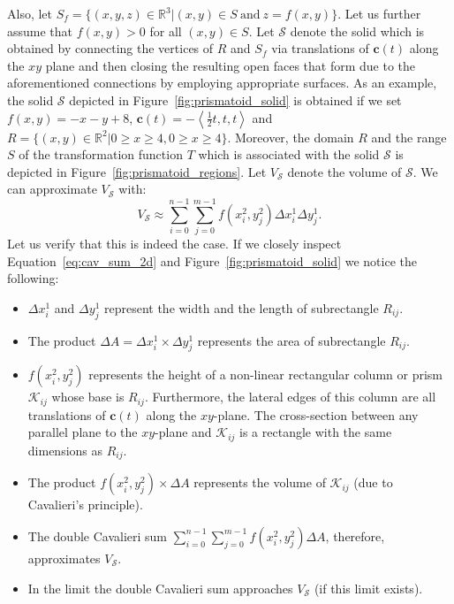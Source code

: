 \documentclass{article}
\theoremstyle{theorem}
\theoremstyle{definition}
\begin{document}
\noindent
Also, let $S_f = \{(x,y,z)\in\mathbb{R}^3|(x,y)\in S ~ \textrm{and} ~ z=f(x,y)\}$.  Let us further assume that $f(x,y) > 0$ for all $(x,y)\in S$. Let $\mathcal{S}$ denote the solid which is obtained by connecting the vertices of $R$ and 
$S_f$ via translations of $\mathbf{c}(t)$ along the $xy$ plane and then closing the resulting open faces that form due to the aforementioned connections by employing appropriate surfaces. 
As an example, the solid $\mathcal{S}$ depicted in Figure~\ref{fig:prismatoid_solid} is obtained if we set $f(x,y) = -x - y + 8$, $\mathbf{c}(t) = -\left<\frac{1}{2}t,t,t\right>$ and $R = \{(x,y)\in\mathbb{R}^2|0 \geq x \geq 4, 0 \geq x \geq 4\} \nonumber$.
Moreover, the domain $R$ and the range $S$ of the transformation function $T$ which is associated with the solid $\mathcal{S}$ is depicted in Figure~\ref{fig:prismatoid_regions}.  
Let $V_{\mathcal{S}}$ denote the volume of $\mathcal{S}$. We can approximate $V_{\mathcal{S}}$ with:
\begin{equation}
\label{eq:cav_sum_2d}
V_{\mathcal{S}} \approx \sum_{i=0}^{n-1} \sum_{j=0}^{m-1} f(x_i^2,y_j^2) \Delta x_i^1 \Delta y_j^1.
\end{equation}
Let us verify that this is indeed the case. If we closely inspect Equation~\ref{eq:cav_sum_2d} and Figure~\ref{fig:prismatoid_solid} we notice the following:
\begin{itemize}
\item $\Delta x_i^1$ and $\Delta y_j^1$ represent the width and the length of subrectangle $R_{ij}$.
\item The product $\Delta A = \Delta x_i^1\times \Delta y_j^1$ represents the area of subrectangle $R_{ij}$.
\item $f(x_i^2,y_j^2)$ represents the height of a non-linear rectangular column or prism $\mathcal{K}_{ij}$ whose base is $R_{ij}$. Furthermore, the lateral edges of this column are all translations 
of $\mathbf{c}(t)$ along the $xy$-plane. The cross-section between any parallel plane to the $xy$-plane and $\mathcal{K}_{ij}$ is a rectangle with the same dimensions as $R_{ij}$. 
\item The product $f(x_i^2,y_j^2)\times \Delta A$ represents the volume of $\mathcal{K}_{ij}$ (due to Cavalieri's principle).
\item The double Cavalieri sum $\sum_{i=0}^{n-1} \sum_{j=0}^{m-1} f(x_i^2,y_j^2) \Delta A$, therefore, approximates $V_{\mathcal{S}}$. 
\item In the limit the double Cavalieri sum approaches $V_{\mathcal{S}}$ (if this limit exists). 
\end{itemize}
\end{document}
